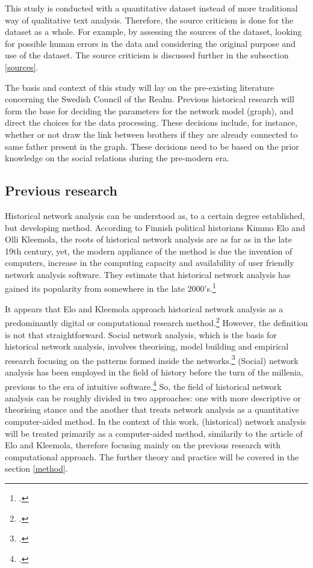 This study is conducted with a quantitative dataset instead of more traditional way of qualitative text analysis. Therefore, the source criticism is done for the dataset as a whole. For example, by assessing the sources of the dataset, looking for possible human errors in the data and considering the original purpose and use of the dataset. The source criticism is discussed further in the subsection \ref{sources}.

The basis and context of this study will lay on the pre-existing literature concerning the Swedish Council of the Realm. Previous historical research will form the base for deciding the parameters for the network model (graph), and direct the choices for the data processing. These decisions include, for instance, whether or not draw the link between brothers if they are already connected to same father present in the graph. These decisions need to be based on the prior knowledge on the social relations during the pre-modern era. 

\subsection{Previous research}
Historical network analysis can be understood as, to a certain degree established, but developing method. According to Finnish political historians Kimmo Elo and Olli Kleemola, the roots of historical network analysis are as far as in the late 19th century, yet, the modern appliance of the method is due the invention of computers, increase in the computing capacity and availability of user friendly network analysis software. They estimate that historical network analysis has gained its popularity from somewhere in the late 2000's.\footcite[p. 415-417.]{eloAklee15} 

It appears that Elo and Kleemola approach historical network analysis as a predominantly digital or computational research method.\footcite[p. 415-417.]{eloAklee15} However, the definition is not that straightforward. Social network analysis, which is the basis for historical network analysis, involves theorising, model building and empirical research focusing on the patterns formed inside the networks.\footcite[p. 22-24.]{Keats-R2007} (Social) network analysis has been employed in the field of history before the turn of the millenia, previous to the era of intuitive software.\footcite[TODO check!]{AronssonEtA1999} So, the field of historical network analysis can be roughly divided in two approaches: one with more descriptive or theorising stance and the another that treats network analysis as a quantitative computer-aided method. In the context of this work, (historical) network analysis will be treated primarily as a computer-aided method, similarily to the article of Elo and Kleemola, therefore focusing mainly on the previous research with computational approach. The further theory and practice will be covered in the section \ref{method}.

